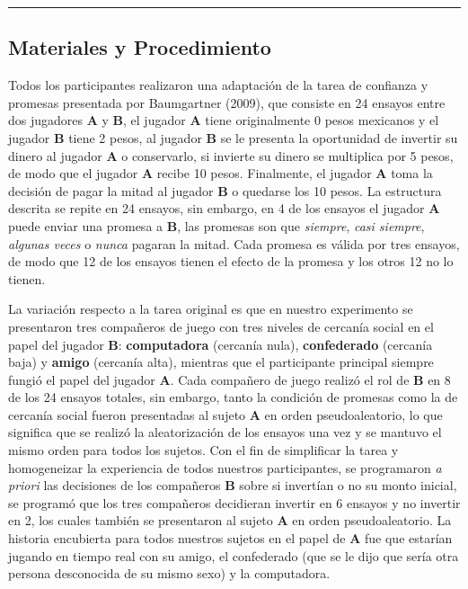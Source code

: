 \documentclass[12pt,]{article}
\begin{document}
\begin{center}\rule{0.5\linewidth}{\linethickness}\end{center}

\subsection{Materiales y
Procedimiento}\label{materiales-y-procedimiento}

Todos los participantes realizaron una adaptación de la tarea de
confianza y promesas presentada por Baumgartner (2009), que consiste en
24 ensayos entre dos jugadores \textbf{A} y \textbf{B}, el jugador
\textbf{A} tiene originalmente 0 pesos mexicanos y el jugador \textbf{B}
tiene 2 pesos, al jugador \textbf{B} se le presenta la oportunidad de
invertir su dinero al jugador \textbf{A} o conservarlo, si invierte su
dinero se multiplica por 5 pesos, de modo que el jugador \textbf{A}
recibe 10 pesos. Finalmente, el jugador \textbf{A} toma la decisión de
pagar la mitad al jugador \textbf{B} o quedarse los 10 pesos. La
estructura descrita se repite en 24 ensayos, sin embargo, en 4 de los
ensayos el jugador \textbf{A} puede enviar una promesa a \textbf{B}, las
promesas son que \emph{siempre}, \emph{casi siempre}, \emph{algunas
veces} o \emph{nunca} pagaran la mitad. Cada promesa es válida por tres
ensayos, de modo que 12 de los ensayos tienen el efecto de la promesa y
los otros 12 no lo tienen.

La variación respecto a la tarea original es que en nuestro experimento
se presentaron tres compañeros de juego con tres niveles de cercanía
social en el papel del jugador \textbf{B}: \textbf{computadora}
(cercanía nula), \textbf{confederado} (cercanía baja) y \textbf{amigo}
(cercanía alta), mientras que el participante principal siempre fungió
el papel del jugador \textbf{A}. Cada compañero de juego realizó el rol
de \textbf{B} en 8 de los 24 ensayos totales, sin embargo, tanto la
condición de promesas como la de cercanía social fueron presentadas al
sujeto \textbf{A} en orden pseudoaleatorio, lo que significa que se
realizó la aleatorización de los ensayos una vez y se mantuvo el mismo
orden para todos los sujetos. Con el fin de simplificar la tarea y
homogeneizar la experiencia de todos nuestros participantes, se
programaron \emph{a priori} las decisiones de los compañeros \textbf{B}
sobre si invertían o no su monto inicial, se programó que los tres
compañeros decidieran invertir en 6 ensayos y no invertir en 2, los
cuales también se presentaron al sujeto \textbf{A} en orden
pseudoaleatorio. La historia encubierta para todos nuestros sujetos en
el papel de \textbf{A} fue que estarían jugando en tiempo real con su
amigo, el confederado (que se le dijo que sería otra persona desconocida
de su mismo sexo) y la computadora.
\end{document}
